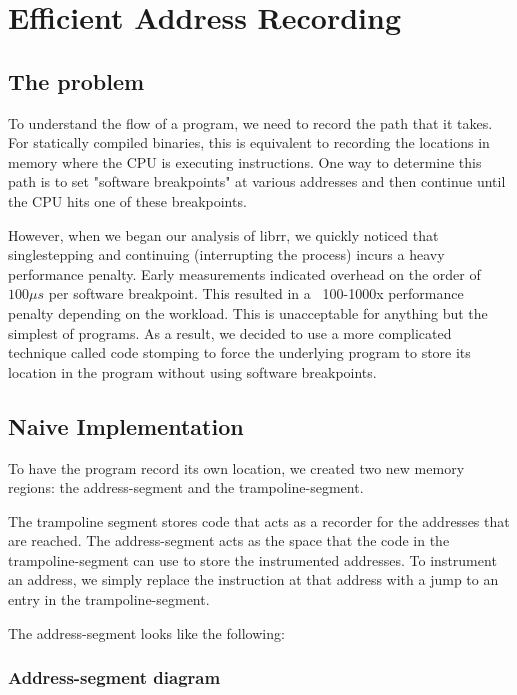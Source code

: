 \chapter{Efficient Address Recording}

\section{The problem}
To understand the flow of a program, we need to record the path that it takes. For statically compiled binaries, this is equivalent to recording the locations in memory where the CPU is executing instructions. One way to determine this path is to set "software breakpoints" at various addresses and then continue until the CPU hits one of these breakpoints.

However, when we began our analysis of librr, we quickly noticed that singlestepping and continuing (interrupting the process) incurs a heavy performance penalty. Early measurements indicated overhead on the order of $100 \mu s$ per software breakpoint. This resulted in a ~100-1000x performance penalty depending on the workload. This is unacceptable for anything but the simplest of programs. As a result, we decided to use a more complicated technique called code stomping to force the underlying program to store its location in the program without using software breakpoints.

\section{Naive Implementation}

To have the program record its own location, we created two new memory regions: the address-segment and the trampoline-segment.

The trampoline segment stores code that acts as a recorder for the addresses that are reached. The address-segment acts as the space that the code in the trampoline-segment can use to store the instrumented addresses. To instrument an address, we simply replace the instruction at that address with a jump to an entry in the trampoline-segment.

The address-segment looks like the following:
\subsection{Address-segment diagram}
\begin{drawstack}
  \startframe
   
  \startframe
   \cellcom{}
   
   \cellcom{}
   \cellcom{}
   \cellcom{}
   
\end{drawstack}

